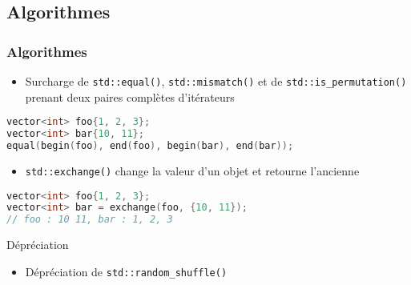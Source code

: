 \documentclass[C++.tex]{subfiles}
\begin{document}
\subsection*{Algorithmes}
\begin{frame}[fragile]
	\frametitle{Algorithmes}
	\begin{itemize}
		\item Surcharge de \lstinline|std::equal()|, \lstinline|std::mismatch()| et de \lstinline|std::is_permutation()| prenant deux paires complètes d'itérateurs

	\end{itemize}

	\begin{lstlisting}[language=C++]
vector<int> foo{1, 2, 3};
vector<int> bar{10, 11};
equal(begin(foo), end(foo), begin(bar), end(bar));\end{lstlisting}

	\begin{itemize}
		\item \lstinline|std::exchange()| change la valeur d'un objet et retourne l'ancienne
	\end{itemize}

	\begin{lstlisting}[language=C++]
vector<int> foo{1, 2, 3};
vector<int> bar = exchange(foo, {10, 11});
// foo : 10 11, bar : 1, 2, 3\end{lstlisting}

	\begin{block}{Dépréciation}
		\begin{itemize}
			\item Dépréciation de \lstinline|std::random_shuffle()|
		\end{itemize}

	\end{block}
\end{frame}
\end{document}
